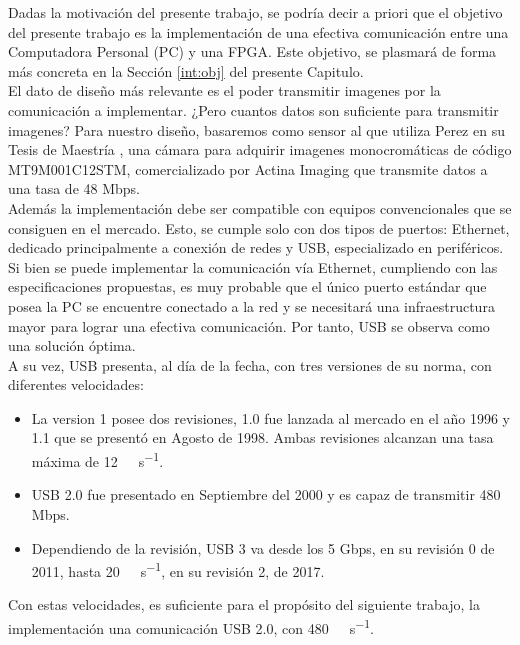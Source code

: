 Dadas la motivación del presente trabajo, se podría decir a priori que el objetivo del presente trabajo es la implementación de una efectiva comunicación entre una Computadora Personal (PC) y una FPGA. Este objetivo, se plasmará de forma más concreta en la Sección \ref{int:obj} del presente Capitulo.\\

El dato de diseño más relevante es el poder transmitir imagenes por la comunicación a implementar. ¿Pero cuantos datos son suficiente para transmitir imagenes? Para nuestro diseño, basaremos como sensor al que utiliza Perez en su Tesis de Maestría \cite{Perez2018}, una cámara para adquirir imagenes monocromáticas de código MT9M001C12STM, comercializado por Actina Imaging \cite{Micron Technology2014} que transmite datos a una tasa de 48 Mbps.\\

Además la implementación debe ser compatible con equipos convencionales que se consiguen en el mercado. Esto, se cumple solo con dos tipos de puertos: Ethernet, dedicado principalmente a conexión de redes y USB, especializado en periféricos.\\

Si bien se puede implementar la comunicación vía Ethernet, cumpliendo con las especificaciones propuestas, es muy probable que el único puerto estándar que posea la PC se encuentre conectado a la red y se necesitará una infraestructura mayor para lograr una efectiva comunicación. Por tanto, USB se observa como una solución óptima.\\

A su vez, USB presenta, al día de la fecha, con tres versiones de su norma, con diferentes velocidades: 

\begin{itemize}
	\item La version 1 posee dos revisiones, 1.0 fue lanzada al mercado en el año 1996 y 1.1 que se presentó en Agosto de 1998. Ambas revisiones alcanzan una tasa máxima de \SI{12}{\mega\bit\per\second}. 
	\item USB 2.0 fue presentado en Septiembre del 2000 y es capaz de transmitir 480 Mbps.
	\item Dependiendo de la revisión, USB 3 va desde los 5 Gbps, en su revisión 0 de 2011, hasta \SI{20}{\giga\bit\per\second}, en su revisión 2, de 2017.
\end{itemize}

Con estas velocidades, es suficiente para el propósito del siguiente trabajo, la implementación una comunicación USB 2.0, con \SI{480}{\mega\bit\per\second}.\\

